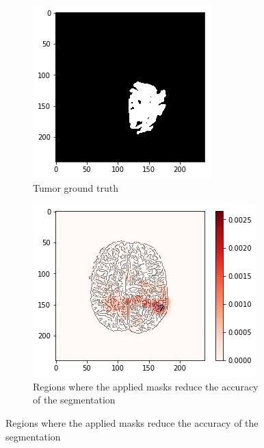 \begin{figure}[H]
\begin{subfigure}[t]{.4\textwidth}
        \includegraphics[width=\linewidth]{chapters/06_hdm/b_Brats18_TCIA08_242_1_L2/20.png}
        \caption{Tumor ground truth}
    \end{subfigure}
    \begin{subfigure}[t]{.45\textwidth}
        \centering
        \includegraphics[width=\linewidth]{chapters/06_hdm/b_Brats18_TCIA08_242_1_L2/23.png}
        \caption{Regions where the applied masks reduce the accuracy of the segmentation}

\end{subfigure}
\end{figure}
